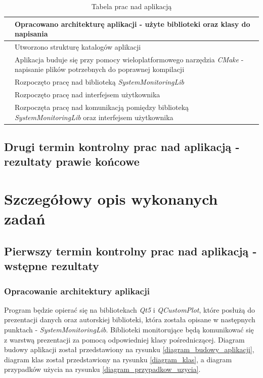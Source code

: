 \documentclass[a4paper]{article}
\newcounter{counter}
\newcommand\rownumber{\stepcounter{counter}\arabic{counter}}
\begin{document}
\begin{table}[h]
\centering
\begin{tabularx}{0.7\linewidth}{ |c|X| }
			\hline 
			\rownumber & Opracowano architekturę aplikacji - użyte biblioteki oraz 
						 klasy do napisania\\ \hline
			\rownumber & Utworzono strukturę katalogów aplikacji \\ \hline
			\rownumber & Aplikacja buduje się przy pomocy wieloplatformowego narzędzia 
						 \textit{CMake} - napisanie plików potrzebnych do poprawnej kompilacji \\ \hline
			\rownumber & Rozpoczęto pracę nad biblioteką \textit{SystemMonitoringLib} \\ \hline
			\rownumber & Rozpoczęto pracę nad interfejsem użytkownika \\ \hline
			\rownumber & Rozpoczęta pracę nad komunikacją pomiędzy biblioteką \textit{SystemMonitoringLib} oraz interfejsem użytkownika \\ \hline
	\end{tabularx}
	\caption{Tabela prac nad aplikacją}
\end{table}

\subsection{Drugi termin kontrolny prac nad aplikacją - rezultaty prawie końcowe}

\section{Szczegółowy opis wykonanych zadań}

\subsection{Pierwszy termin kontrolny prac nad aplikacją - wstępne rezultaty}

\subsubsection{Opracowanie architektury aplikacji}
Program będzie opierać się na bibliotekach \textit{Qt5} i \textit{QCustomPlot}, które posłużą do prezentacji danych oraz autorskiej biblioteki, która została opisane w następnych punktach - \textit{SystemMonitoringLib}. Biblioteki monitorujące będą komunikować się z warstwą prezentacji za pomocą odpowiedniej klasy pośredniczącej. Diagram budowy aplikacji został przedstawiony na rysunku \ref{diagram_budowy_aplikacji},  diagram klas został przedstawiony na rysunku \ref{diagram_klas}, a diagram przypadków użycia na rysunku \ref{diagram_przypadkow_uzycia}.
\end{document}

